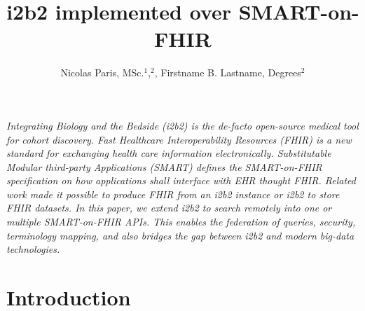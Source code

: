 \documentclass{amia}
\begin{document}
\title{i2b2 implemented over SMART-on-FHIR} 
\author{Nicolas Paris, MSc.$^{1}$,$^{2}$, Firstname B. Lastname, Degrees$^{2}$}


\maketitle


\textit{Integrating Biology and the Bedside (i2b2) is the de-facto open-source medical tool for cohort discovery. Fast Healthcare Interoperability Resources (FHIR) is a new standard for exchanging health care information electronically. Substitutable Modular third-party Applications (SMART) defines the SMART-on-FHIR specification on how applications shall interface with EHR thought FHIR. Related work made it possible to produce FHIR from an i2b2 instance or i2b2 to store FHIR datasets. In this paper, we extend i2b2 to search remotely into one or multiple SMART-on-FHIR APIs. This enables the federation of queries, security, terminology mapping, and also bridges the gap between i2b2 and modern big-data technologies.}

\section*{Introduction}
\end{document}
